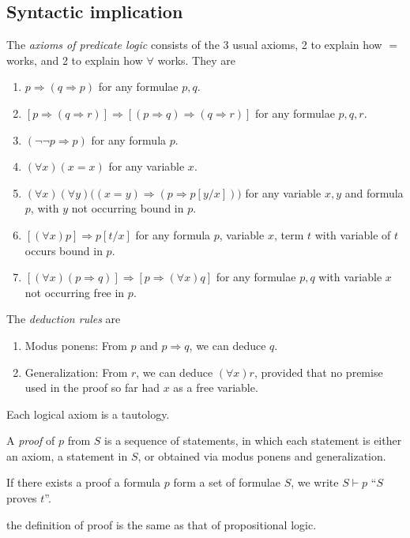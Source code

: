 \documentclass[a4paper]{article}
\begin{document}
\subsection{Syntactic implication}
\begin{defi}
  The \emph{axioms of predicate logic} consists of the 3 usual axioms, 2 to explain how $=$ works, and 2 to explain how $\forall$ works. They are
  \begin{enumerate}[label=\arabic{*}.]
    \item $p\Rightarrow (q\Rightarrow p)$ for any formulae $p, q$.
    \item $[p\Rightarrow (q\Rightarrow r)] \Rightarrow [(p\Rightarrow q)\Rightarrow (q\Rightarrow r)]$ for any formulae $p, q, r$.
    \item $(\neg \neg p\Rightarrow p)$ for any formula $p$.
    \item $(\forall x)(x = x)$ for any variable $x$.
    \item $(\forall x)(\forall y)\big((x = y)\Rightarrow (p \Rightarrow p[y/x])\big)$ for any variable $x, y$ and formula $p$, with $y$ not occurring bound in $p$.
    \item $[(\forall x)p] \Rightarrow  p[t/x]$ for any formula $p$, variable $x$, term $t$ with variable of $t$ occurs bound in $p$.
    \item $[(\forall x)(p\Rightarrow q)]\Rightarrow [p\Rightarrow (\forall x)q]$ for any formulae $p, q$ with variable $x$ not occurring free in $p$.
  \end{enumerate}
  The \emph{deduction rules} are
  \begin{enumerate}[label=\arabic{*}.]
    \item Modus ponens: From $p$ and $p\Rightarrow q$, we can deduce $q$.
    \item Generalization: From $r$, we can deduce $(\forall x)r$, provided that no premise used in the proof so far had $x$ as a free variable.
  \end{enumerate}
\end{defi}
\note Each logical axiom is a tautology.

\begin{defi}[Proof]
  A \emph{proof} of $p$ from $S$ is a sequence of statements, in which each statement is either an axiom, a statement in $S$, or obtained via modus ponens and generalization.
\end{defi}
\begin{defi}
  If there exists a proof a formula $p$ form a set of formulae $S$, we write $S\vdash p$ ``$S$ proves $t$''.
\end{defi}
\note the definition of proof is the same as that of propositional logic.
\end{document}
